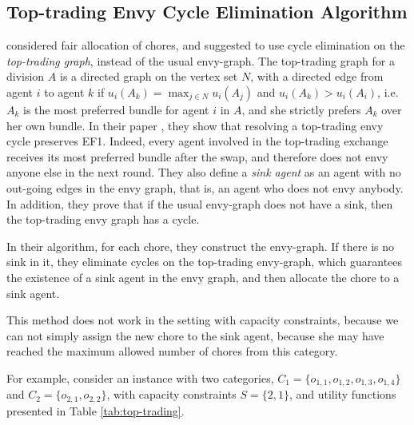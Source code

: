 \documentclass[sigconf]{aamas}
\theoremstyle{definition}
\begin{document}
\subsection{Top-trading Envy Cycle Elimination Algorithm}
\citet{vaish2020} considered  fair allocation of chores, and suggested to use cycle elimination on the \emph{top-trading graph}, instead of the usual envy-graph.
The top-trading graph for a division $A$ is a directed graph on the vertex set $N$, with a directed edge from agent $i$ to agent $k$ if $u_i(A_k) = \max_{j \in N} u_i(A_j)$ and $u_i(A_k) > u_i(A_i)$, i.e. $A_k$ is the most preferred bundle for agent $i$ in $A$, and she strictly prefers $A_k$ over her own bundle.
In their paper \cite{vaish2020}, they show that resolving a top-trading envy cycle preserves EF1. Indeed, every agent involved in the top-trading exchange receives its most preferred bundle after the swap, and therefore does not envy anyone else in the next round.
They also define a \emph{sink agent} as an agent with no out-going edges in the envy graph,
that is, an agent who does not envy anybody.
In addition, they prove that if the usual envy-graph does not have a sink, then the top-trading envy graph has a cycle. 

In their algorithm, for each chore, they construct the envy-graph. If there is no sink in it, they eliminate cycles on the top-trading envy-graph, which guarantees the existence of a sink agent in the envy graph, and then allocate the chore to a sink agent.

This method does not work in the setting with capacity constraints, because we can not simply assign the new chore to the sink agent, because she may have reached the maximum allowed number of chores from this category.

For example, consider an instance with two categories, $C_1=\{o_{1,1}, o_{1,2}, o_{1,3}, o_{1,4}\}$ and $C_2=\{o_{2,1}, o_{2,2}\}$, with capacity constraints $S=\{2,1\}$, and utility functions presented in Table \ref{tab:top-trading}.
\end{document}
